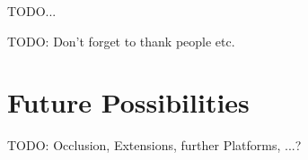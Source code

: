TODO...

TODO: Don't forget to thank people etc.

\section{Future Possibilities}

TODO: Occlusion, Extensions, further Platforms, ...?
